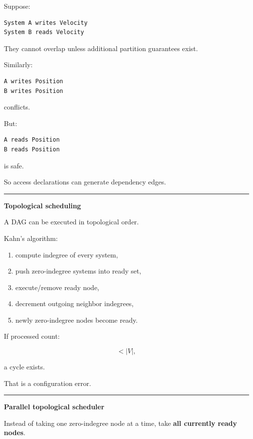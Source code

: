 Suppose:

\begin{verbatim}
System A writes Velocity
System B reads Velocity
\end{verbatim}

They cannot overlap unless additional partition guarantees exist.

Similarly:

\begin{verbatim}
A writes Position
B writes Position
\end{verbatim}

conflicts.

But:

\begin{verbatim}
A reads Position
B reads Position
\end{verbatim}

is safe.

So access declarations can generate dependency edges.

\begin{center}\rule{0.5\linewidth}{0.5pt}\end{center}

\textbf{Topological scheduling}

A DAG can be executed in topological order.

Kahn's algorithm:

\begin{enumerate}
\def\labelenumi{\arabic{enumi}.}
\tightlist
\item
  compute indegree of every system,
\item
  push zero-indegree systems into ready set,
\item
  execute/remove ready node,
\item
  decrement outgoing neighbor indegrees,
\item
  newly zero-indegree nodes become ready.
\end{enumerate}

If processed count:

\[
<|V|,
\]

a cycle exists.

That is a configuration error.

\begin{center}\rule{0.5\linewidth}{0.5pt}\end{center}

\textbf{Parallel topological scheduler}

Instead of taking one zero-indegree node at a time, take \textbf{all currently ready nodes}.

